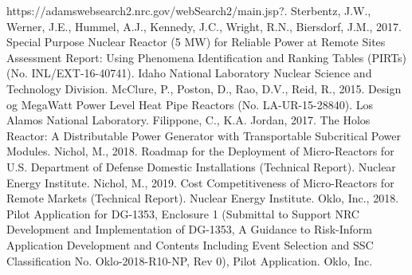 \documentclass[10pt,a4paper]{article}
\begin{document}
\begin{thebibliography}{X}
 https://adamswebsearch2.nrc.gov/webSearch2/main.jsp?.
  Sterbentz, J.W., Werner, J.E., Hummel, A.J., Kennedy, J.C., Wright, R.N., Biersdorf, J.M., 2017. Special Purpose Nuclear Reactor (5 MW) for Reliable Power at Remote Sites Assessment Report: Using Phenomena Identification and Ranking Tables (PIRTs) (No. INL/EXT-16-40741). Idaho National Laboratory Nuclear Science and Technology Division.
  McClure, P., Poston, D., Rao, D.V., Reid, R., 2015. Design og MegaWatt Power Level Heat Pipe Reactors (No. LA-UR-15-28840). Los Alamos National Laboratory.
  Filippone, C., K.A. Jordan, 2017. The Holos Reactor: A Distributable Power Generator with Transportable Subcritical Power Modules. 
 Nichol, M., 2018. Roadmap for the Deployment of Micro-Reactors for U.S. Department of Defense Domestic Installations (Technical Report). Nuclear Energy Institute.
 Nichol, M., 2019. Cost Competitiveness of Micro-Reactors for Remote Markets (Technical Report). Nuclear Energy Institute.
 Oklo, Inc., 2018. Pilot Application for DG-1353, Enclosure 1 (Submittal to Support NRC Development and Implementation of DG-1353, A Guidance to Risk-Inform Application Development and Contents Including Event Selection and SSC Classification No. Oklo-2018-R10-NP, Rev 0), Pilot Application. Oklo, Inc.





\end{thebibliography}
\end{document}
